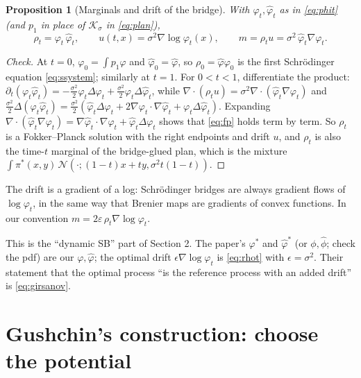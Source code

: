 \documentclass[11pt]{article}
\newcommand{\eps}{\varepsilon}
\newcommand{\dv}{\nabla\cdot}
\newcommand{\Nc}{\mathcal{N}}
\newcommand{\Kc}{\mathcal{K}}
\newcommand{\hphi}{\hat\varphi}
\theoremstyle{definition}
\theoremstyle{plain}
\newtheorem{proposition}[definition]{Proposition}
\begin{document}
\begin{proposition}[Marginals and drift of the bridge]
\label{prop:bridge}
With $\varphi_t,\hphi_t$ as in \eqref{eq:phit} (and $p_1$ in place of $\Kc_\sigma$ in
\eqref{eq:plan}),
\begin{equation}
  \label{eq:rhot}
  \rho_t=\varphi_t\,\hphi_t,\qquad u(t,x)=\sigma^2\nabla\log\varphi_t(x),\qquad
  m=\rho_tu=\sigma^2\,\hphi_t\nabla\varphi_t .
\end{equation}
\end{proposition}
\begin{proof}[Check]
At $t=0$, $\varphi_0=\int p_1\varphi$ and $\hphi_0=\hphi$, so $\rho_0=\hphi\varphi_0$ is the
first Schr\"odinger equation \eqref{eq:ssystem}; similarly at $t=1$. For $0<t<1$, differentiate
the product: $\partial_t(\varphi_t\hphi_t)=-\tfrac{\sigma^2}{2}\hphi_t\Delta\varphi_t+\tfrac{\sigma^2}{2}\varphi_t\Delta\hphi_t$,
while $\dv(\rho_tu)=\sigma^2\dv(\hphi_t\nabla\varphi_t)$ and
$\tfrac{\sigma^2}{2}\Delta(\varphi_t\hphi_t)=\tfrac{\sigma^2}{2}(\hphi_t\Delta\varphi_t+2\nabla\varphi_t\!\cdot\!\nabla\hphi_t+\varphi_t\Delta\hphi_t)$.
Expanding $\dv(\hphi_t\nabla\varphi_t)=\nabla\hphi_t\!\cdot\!\nabla\varphi_t+\hphi_t\Delta\varphi_t$
shows that \eqref{eq:fp} holds term by term. So $\rho_t$ is a Fokker--Planck solution with
the right endpoints and drift $u$, and $\rho_t$ is also the time-$t$ marginal of the
bridge-glued plan, which is the mixture $\int\pi^*(x,y)\,\Nc(\cdot;(1-t)x+ty,\sigma^2t(1-t))$.
\end{proof}
The drift is a gradient of a log: Schr\"odinger bridges are always gradient flows of
$\log\varphi_t$, in the same way that Brenier maps are gradients of convex functions. In
our convention $m=2\eps\,\rho_t\nabla\log\varphi_t$.

\begin{readbox}
This is the ``dynamic SB'' part of Section 2. The paper's $\varphi^*$ and $\hat\varphi^*$
(or $\phi,\hat\phi$; check the pdf) are our $\varphi,\hphi$; the optimal drift
$\epsilon\nabla\log\varphi_t$ is \eqref{eq:rhot} with $\epsilon=\sigma^2$. Their statement
that the optimal process ``is the reference process with an added drift'' is \eqref{eq:girsanov}.
\end{readbox}

\section{Gushchin's construction: choose the potential}
\label{sec:gushchin}
\end{document}
